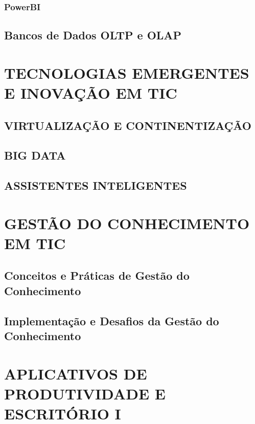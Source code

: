 \documentclass[
]{book}
\begin{document}
\subsection{PowerBI}\label{powerbi}

\section{Bancos de Dados OLTP e OLAP}\label{bancos-de-dados-oltp-e-olap}

\chapter{TECNOLOGIAS EMERGENTES E INOVAÇÃO EM TIC}\label{tecnologias-emergentes-e-inovauxe7uxe3o-em-tic}

\section{VIRTUALIZAÇÃO E CONTINENTIZAÇÃO}\label{virtualizauxe7uxe3o-e-continentizauxe7uxe3o}

\section{BIG DATA}\label{big-data}

\section{ASSISTENTES INTELIGENTES}\label{assistentes-inteligentes}

\chapter{GESTÃO DO CONHECIMENTO EM TIC}\label{gestuxe3o-do-conhecimento-em-tic}

\section{Conceitos e Práticas de Gestão do Conhecimento}\label{conceitos-e-pruxe1ticas-de-gestuxe3o-do-conhecimento}

\section{Implementação e Desafios da Gestão do Conhecimento}\label{implementauxe7uxe3o-e-desafios-da-gestuxe3o-do-conhecimento}

\chapter{APLICATIVOS DE PRODUTIVIDADE E ESCRITÓRIO I}\label{aplicativos-de-produtividade-e-escrituxf3rio-i}
\end{document}
